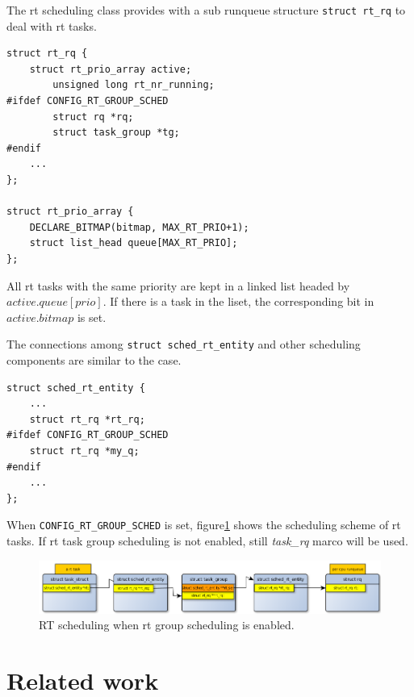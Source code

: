 The rt scheduling class provides with a sub runqueue structure 
\texttt{struct rt\_rq} to deal with rt tasks.
\begin{lstlisting}
struct rt_rq {
	struct rt_prio_array active;
        unsigned long rt_nr_running;
#ifdef CONFIG_RT_GROUP_SCHED
        struct rq *rq;
        struct task_group *tg;
#endif
	...
};

struct rt_prio_array {
	DECLARE_BITMAP(bitmap, MAX_RT_PRIO+1); 
	struct list_head queue[MAX_RT_PRIO];
};
\end{lstlisting}
All rt tasks with the same priority are kept in a linked list headed by
$active.queue[prio]$. If there is a task in the liset, the corresponding 
bit in $active.bitmap$ is set.

The connections among \texttt{struct sched\_rt\_entity} and other scheduling
components are similar to the  case.
\begin{lstlisting}
struct sched_rt_entity {
	...
	struct rt_rq *rt_rq;
#ifdef CONFIG_RT_GROUP_SCHED
	struct rt_rq *my_q;
#endif
	...
}; 
\end{lstlisting}
When \texttt{CONFIG\_RT\_GROUP\_SCHED} is set, figure\ref{fig:rt_scheme_tg} 
shows the scheduling scheme of rt tasks. If rt task group scheduling is 
not enabled, still \emph{task\_rq} marco will be used.
\begin{figure}[htbp]
        \centering
        \includegraphics[width=\textwidth]{images/rt_scheduling_scheme_tg}
        \caption{RT scheduling when rt group scheduling is enabled.}
        \label{fig:rt_scheme_tg}
\end{figure}

\section{Related work\label{sec:RelatedWork}}

